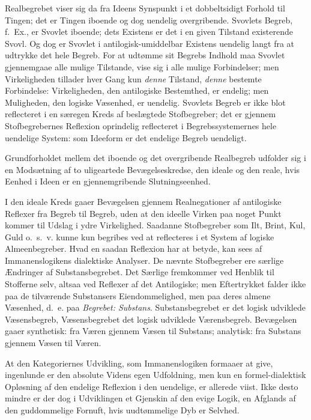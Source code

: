 \documentclass[12pt]{book}
\newcommand{\opage}[1]{\marginnote{\footnotesize\textit{[#1]}}}
\begin{document}
Realbegrebet viser sig da fra Ideens Synspunkt i et
dobbeltsidigt Forhold til Tingen; det er Tingen iboende og
dog uendelig overgribende. Svovlets Begreb, f.~Ex., er
Svovlet iboende; dets Existens er det i en given Tilstand
existerende Svovl. Og dog er Svovlet i antilogisk-umiddelbar
Existens uendelig langt fra at udtrykke det hele Begreb.
For at udtømme sit Begrebs Indhold maa Svovlet
gjennemgaae alle mulige Tilstande, vise sig i alle mulige
Forbindelser; men Virkeligheden tillader hver Gang kun \emph{denne}
Tilstand, \emph{denne} bestemte Forbindelse: Virkeligheden, den
antilogiske Bestemthed, er endelig; men Muligheden, den logiske
Væsenhed, er uendelig. Svovlets Begreb er ikke blot
reflecteret i en særegen Kreds af beslægtede Stofbegreber; det er
gjennem Stofbegrebernes Reflexion oprindelig reflecteret i
Begrebssystemernes hele uendelige System: som Ideeform er
det endelige Begreb uendeligt.

Grundforholdet mellem det iboende og det overgribende
Realbegreb udfolder sig i en Modsætning af to uligeartede
\opage{43} Bevægelseskredse, den ideale og den reale, hvis Eenhed i Ideen
er en gjennemgribende Slutningseenhed.

I den ideale Kreds gaaer Bevægelsen gjennem
Realnegationer af antilogiske Reflexer fra Begreb til Begreb, uden
at den ideelle Virken paa noget Punkt kommer til Udslag i
ydre Virkelighed. Saadanne Stofbegreber som Ilt, Brint,
Kul, Guld o.~s.~v. kunne kun begribes ved at reflecteres i et
System af logiske Almeenbegreber. Hvad en saadan Reflexion
har at betyde, kan sees af Immanenslogikens dialektiske
Analyser. De nævnte Stofbegreber ere særlige Ændringer af
Substansbegrebet. Det Særlige fremkommer ved Henblik
til Stofferne selv, altsaa ved Reflexer af det Antilogiske; men
Eftertrykket falder ikke paa de tilværende Substansers
Eiendommelighed, men paa deres almene Væsenhed, d.~e. paa
\emph{Begrebet: Substans}. Substansbegrebet er det logisk
udviklede Væsensbegreb, Væsensbegrebet det logisk udviklede
Værensbegreb. Bevægelsen gaaer synthetisk: fra Væren
gjennem Væsen til Substans; analytisk: fra Substans gjennem
Væsen til Væren.

At den Kategoriernes Udvikling, som Immanenslogiken
formaaer at give, ingenlunde er den absolute Videns egen
Udfoldning, men kun en formel-dialektisk Opløsning af den
endelige Reflexion i den uendelige, er allerede viist. Ikke
desto mindre er der dog i Udviklingen et Gjenskin af den
evige Logik, en Afglands af den guddommelige Fornuft, hvis
uudtømmelige Dyb er Selvhed.
\end{document}
